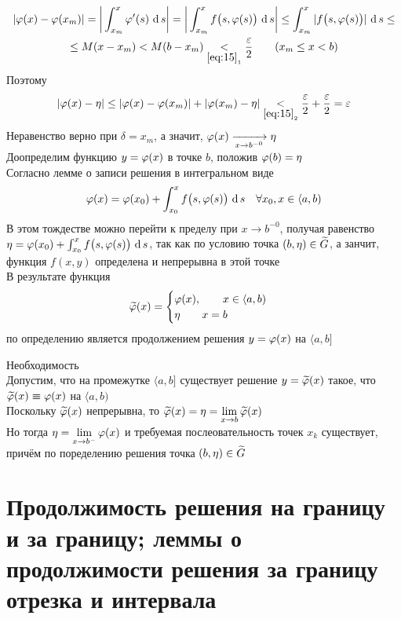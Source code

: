 \begin{iproof}
\begin{multline*}
        |\vphi(x) - \vphi(x_m)| = \bigg| \dint[s]{x_m}x{\vphi'(s)}\bigg| = \bigg| \dint[s]{x_m}x{f \big( s, \vphi(s) \big)}\bigg| \le \dint[s]{x_m}x{|f \big( s, \vphi(s) \big)|} \le \\
        \le M(x - x_m) < M(b - x_m) \underset{\eref{15}_1}< \frac\veps2 \qquad (x_m \le x < b)
    \end{multline*}
    Поэтому
    $$ |\vphi(x) - \eta| \le |\vphi(x) - \vphi(x_m)| + |\vphi(x_m) - \eta| \underset{\eref{15}_2}< \frac\veps2 + \frac\veps2 = \veps $$
    Неравенство  верно при $ \delta = x_m $, а значит, $ \vphi(x) \underarr{x \to b^{-0}} \eta $ \\
    Доопределим функцию $ y = \vphi(x) $ в точке $ b $, положив $ \vphi(b) = \eta $ \\
    Согласно лемме о записи решения в интегральном виде
	$$ \vphi(x) = \vphi(x_0) + \dint[s]{x_0}x{f \big(s, \vphi(s) \big)} \quad \forall x_0, x \in \langle a, b) $$
    В этом тождестве можно перейти к пределу при $ x \to b^{-0} $, получая равенство $ \eta = \vphi(x_0) + \dint[s]{x_0}x{f \big( s, \vphi(s) \big)} $, так как по условию точка $ (b, \eta) \in \vawe{G} $, а занчит, функция $ f(x, y) $ определена и непрерывна в этой точке \\
    В результате функция
    $$ \vawe\vphi(x) =
    \begin{cases}
    	\vphi(x), \qquad x \in \langle a, b) \\
        \eta \qquad x = b
    \end{cases} $$
    по определению является продолжением решения $ y = \vphi(x) $ на $ \langle a, b] $
    \item Необходимость \\
    Допустим, что на промежутке $ \langle a, b] $ существует решение $ y = \vawe\vphi(x) $ такое, что $ \vawe\vphi(x) \equiv \vphi(x) $ на $ \langle a, b) $ \\
    Поскольку $ \vawe\vphi(x) $ непрерывна, то $ \vawe\vphi(x) = \eta = \liml{x \to b}\vawe\vphi(x) $ \\
    Но тогда $ \eta = \liml{x \to b^-}\vphi(x) $ и требуемая послеовательность точек $ x_k $ существует, причём по поределению решения точка $ (b, \eta) \in \vawe{G} $
\end{iproof}

\section{Продолжимость решения на границу и за границу; леммы о продолжимости решения за границу отрезка и интервала}

